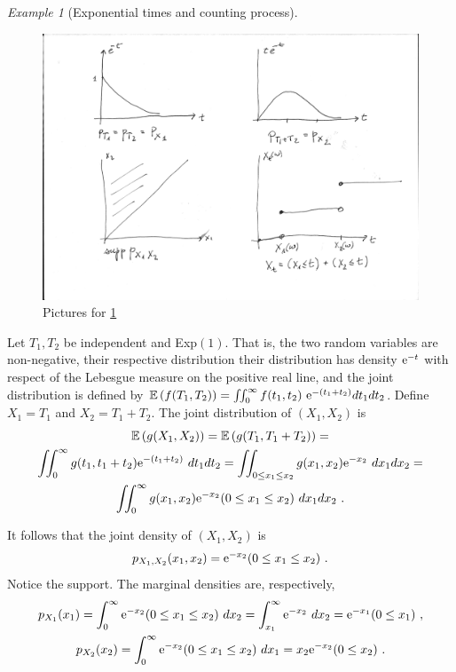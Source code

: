 \documentclass[12pt,a4paper]{amsart}
\theoremstyle{plain}%
\theoremstyle{definition}
\theoremstyle{remark}
\newtheorem{example}{Example}
\begin{document}
 \begin{example}[Exponential times and counting process]
   \label{ex:exponential}
\begin{figure}
  \centering
  \includegraphics[height=.3\textheight]{pictures/exponential.pdf}
  \caption{Pictures for \cref{ex:exponential}}
\end{figure}
Let $T_1,T_2$
   be independent and Exp$(1)$. That is, the two random variables are
   non-negative, their respective distribution their distribution has
   density $\mathrm{e}^{-t}$ with respect of the Lebesgue measure on the
   positive real line, and the joint distribution is defined by
   $\operatorname{\mathbb E}\left(f(T_1,T_2)\right) = \iint_0^\infty f(t_1,t_2) \
   \mathrm{e}^{-(t_1+t_2)} dt_1dt_2$. Define $X_1 = T_1$ and
   $X_2=T_1+T_2$. The joint distribution of $(X_1,X_2)$ is
   \begin{multline*}
     \operatorname{\mathbb E}\left(g(X_1,X_2)\right) = \operatorname{\mathbb E}\left(g(T_1,T_1+T_2)\right) = \\
     \iint_0^\infty g(t_1,t_1+t_2) \mathrm{e}^{-(t_1+t_2)} \ dt_1dt_2 =
     \iint_{0 \leq x_1 \leq x_2} g(x_1,x_2) \mathrm{e}^{-x_2} \ dx_1dx_2 = \\
 \iint_0^\infty g(x_1,x_2) \mathrm{e}^{-x_2}(0 \leq x_1 \leq x_2) \
 dx_1dx_2 \ .  \end{multline*}

It follows that the joint density of $(X_1,X_2)$ is
$$p_{X_1,X_2}(x_1,x_2) = \mathrm{e}^{-x_2}(0 \leq x_1 \leq x_2) \ .$$ Notice
the support. The marginal densities are, respectively,
\begin{gather*}
  p_{X_1}(x_1) = \int_0^\infty \euler^{-x_2}(0 \leq x_1 \leq x_2)
  \ dx_2 = \int_{x_1}^\infty \euler^{-x_2} \ dx_2 = \euler^{-x_1} (0
  \leq x_1)\ ,\\
  p_{X_2}(x_2) = \int_0^\infty \euler^{-x_2}(0 \leq x_1 \leq x_2) \ dx_1=
  x_2 \euler^{-x_2} (0 \leq x_2) \ .  \end{gather*}


\end{example}
\end{document}
